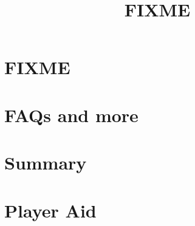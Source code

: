 \documentclass[10pt]{article}
\title{FIXME}
\begin{document}
\maketitle


\tableofcontents


\begin{multicols}{2}

\section{FIXME}

\section{FAQs and more}

\section{Summary}

\end{multicols}

\appendix

\section{Player Aid}
\end{document}
